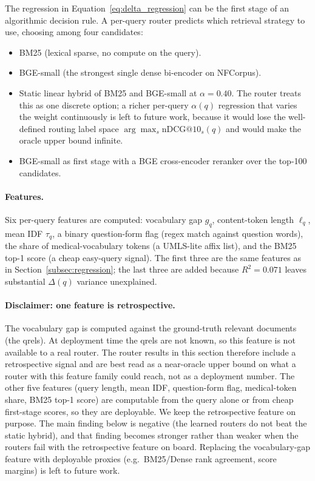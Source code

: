 \documentclass[11pt,a4paper]{article}
\begin{document}
The regression in Equation~\ref{eq:delta_regression} can be the first
stage of an algorithmic decision rule. A per-query router predicts
which retrieval strategy to use, choosing among four candidates:
\begin{itemize}[noitemsep,topsep=2pt]
    \item BM25 (lexical sparse, no compute on the query).
    \item BGE-small (the strongest single dense bi-encoder on NFCorpus).
    \item Static linear hybrid of BM25 and BGE-small at $\alpha=0.40$.
    The router treats this as one discrete option; a richer per-query
    $\alpha(q)$ regression that varies the weight continuously is left
    to future work, because it would lose the well-defined routing
    label space $\arg\max_s \text{nDCG@10}_s(q)$ and would make the
    oracle upper bound infinite.
    \item BGE-small as first stage with a BGE cross-encoder reranker
    over the top-100 candidates.
\end{itemize}

\paragraph{Features.}
Six per-query features are computed: vocabulary gap $g_q$, content-token
length $\ell_q$, mean IDF $\tau_q$, a binary question-form flag (regex
match against question words), the share of medical-vocabulary tokens
(a UMLS-lite affix list), and the BM25 top-1 score (a cheap easy-query
signal). The first three are the same features as in
Section~\ref{subsec:regression}; the last three are added because
$R^2 = 0.071$ leaves substantial $\Delta(q)$ variance unexplained.

\paragraph{Disclaimer: one feature is retrospective.}
The vocabulary gap is computed against the ground-truth relevant
documents (the qrels). At deployment time the qrels are not known, so
this feature is not available to a real router. The router results in
this section therefore include a retrospective signal and are best
read as a near-oracle upper bound on what a router with this feature
family could reach, not as a deployment number. The other five
features (query length, mean IDF, question-form flag, medical-token
share, BM25 top-1 score) are computable from the query alone or from
cheap first-stage scores, so they are deployable. We keep the
retrospective feature on purpose. The main finding below is negative
(the learned routers do not beat the static hybrid), and that finding
becomes stronger rather than weaker when the routers fail with the
retrospective feature on board. Replacing the vocabulary-gap feature
with deployable proxies (e.g.\ BM25/Dense rank agreement, score margins)
is left to future work.
\end{document}

